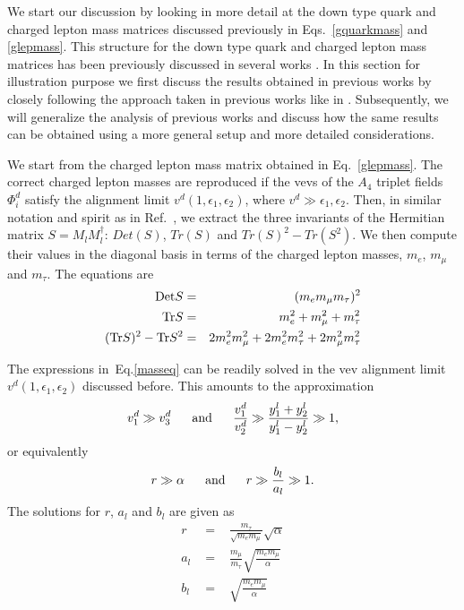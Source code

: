 \documentclass[english,10pt,aps,prd,a4paper,preprintnumbers,floatfix,nofootinbib,showpacs,superscriptaddress]{revtex4-1}
\begin{document}
We start our discussion by looking in more detail at the down type
quark and charged lepton mass matrices discussed previously in
Eqs.~\ref{gquarkmass} and \ref{glepmass}. This structure for the down
type quark and charged lepton mass matrices has been previously
discussed in several works
\cite{Morisi:2011pt,King:2013hj,Morisi:2013eca,Bonilla:2014xla}. In
this section for illustration purpose we first discuss the results
obtained in previous works by closely following the approach taken in
previous works like in \cite{Morisi:2009sc}. Subsequently, we will
generalize the analysis of previous works and discuss how the same
results can be obtained using a more general setup and more detailed
considerations.

We start from the charged lepton mass matrix obtained in
Eq.~\ref{glepmass}. The correct charged lepton masses are reproduced
if the vevs of the $A_4$ triplet fields $\Phi^d_i$ satisfy the
alignment limit $v^d(1, \epsilon_1, \epsilon_2)$, where
$v^d \gg \epsilon_1, \epsilon_2$. Then, in similar notation and spirit
as in Ref.~\cite{Morisi:2009sc}, we extract the three invariants of
the Hermitian matrix $S = M_l M_l^\dagger$: $Det(S)$, $Tr(S)$ and
$Tr(S)^2-Tr(S^2)$. We then compute their values in the diagonal
basis in terms of the charged lepton masses, $m_e$, $m_\mu$ and
$m_\tau$. The equations are
   \begin{eqnarray}
   \textnormal{Det} S &=& (m_e m_\mu m_\tau)^2 \nonumber \\
   \textnormal{Tr} S& =& m_e^2 + m_\mu^2 + m_\tau^2 \nonumber  \\
    (\textnormal{Tr} S)^2 - \textnormal{Tr} S^2 &=& 2m_e^2m_\mu^2 + 2m_e^2 m_\tau^2 + 2m_\mu^2 m_\tau^2
    \label{masseq}
  \end{eqnarray}
 
  The expressions in~Eq.\ref{masseq} can be readily solved in the
  vev alignment limit $v^d(1, \epsilon_1, \epsilon_2)$ discussed
  before.
%
  This amounts to the approximation 
  $$v_1^d \gg v_3^d~~~~~ {\rm and}~~~~~\dfrac{v_1^d}{v_2^d} \gg \dfrac{y_1^l+y_2^l}{y_1^l-y_2^l} \gg 1,$$
or equivalently  $$r \gg \alpha~~~~~{\rm and}~~~~~
  r \gg \dfrac{b_l}{a_l} \gg 1.$$
%
  The solutions for $r$, $a_l$ and $b_l$ are given as
\begin{eqnarray}
   r & \,\,=\,\, & \frac{m_\tau}{\sqrt{m_e m_\mu}} \sqrt{\alpha}  \label{rleq} \\
   a_l & \,\,=\,\, & \frac{m_\mu}{m_\tau} \sqrt{\frac{m_e m_\mu}{\alpha}}  \label{aleq} \\
    b_l & \,\,=\,\, & \sqrt{\frac{m_e m_\mu}{\alpha}}  \label{bleq}
\end{eqnarray}
 
\end{document}
